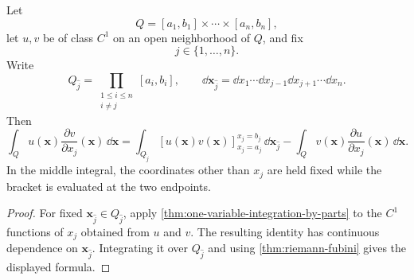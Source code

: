 \begin{theorem}
\label{thm:coordinatewise-integration-by-parts}
Let
\[
Q=[a_1,b_1]\times\cdots\times[a_n,b_n],
\]
let \(u,v\) be of class \(C^1\) on an open neighborhood of \(Q\), and fix
\[
j\in\{1,\ldots,n\}.
\]
Write
\[
Q_{\widehat j}
=
\prod_{\substack{1\leq i\leq n\\ i\ne j}}[a_i,b_i],
\qquad
\dd\mathbf{x}_{\widehat j}
=
\dd x_1\cdots\dd x_{j-1}\dd x_{j+1}\cdots\dd x_n.
\]
Then
\[
\int_Q u(\mathbf{x})\frac{\partial v}{\partial x_j}(\mathbf{x})\,\dd\mathbf{x}
=
\int_{Q_{\widehat j}}
\left[
u(\mathbf{x})v(\mathbf{x})
\right]_{x_j=a_j}^{x_j=b_j}\,\dd\mathbf{x}_{\widehat j}
-
\int_Q v(\mathbf{x})\frac{\partial u}{\partial x_j}(\mathbf{x})\,\dd\mathbf{x}.
\]
In the middle integral, the coordinates other than \(x_j\) are held fixed
while the bracket is evaluated at the two endpoints.
\end{theorem}
\begin{proof}
For fixed \(\mathbf{x}_{\widehat j}\in Q_{\widehat j}\), apply
\cref{thm:one-variable-integration-by-parts} to the \(C^1\) functions of
\(x_j\) obtained from \(u\) and \(v\).  The resulting identity has continuous
dependence on \(\mathbf{x}_{\widehat j}\).  Integrating it over \(Q_{\widehat j}\) and
using \cref{thm:riemann-fubini} gives the displayed formula.
\end{proof}

